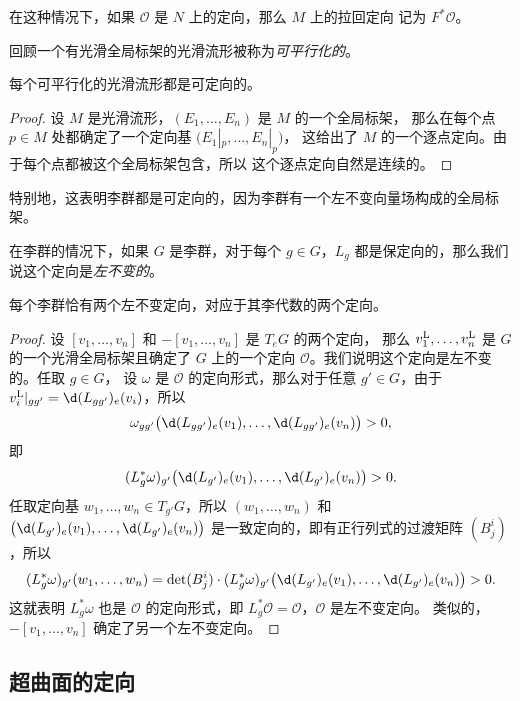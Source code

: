在这种情况下，如果 $\mathcal{O}$ 是 $N$ 上的定向，那么 $M$ 上的拉回定向
记为 $F^*\mathcal{O}$。

回顾一个有光滑全局标架的光滑流形被称为\emph{可平行化的}。

\begin{proposition}
  每个可平行化的光滑流形都是可定向的。
\end{proposition}
\begin{proof}
  设 $M$ 是光滑流形，$(E_1,\dots,E_n)$ 是 $M$ 的一个全局标架，
  那么在每个点 $p\in M$ 处都确定了一个定向基 $\bigl(E_1|_p,\dots,E_n|_p\bigr)$，
  这给出了 $M$ 的一个逐点定向。由于每个点都被这个全局标架包含，所以
  这个逐点定向自然是连续的。
\end{proof}

特别地，这表明李群都是可定向的，因为李群有一个左不变向量场构成的全局标架。

在李群的情况下，如果 $G$ 是李群，对于每个 $g\in G$，$L_g$
都是保定向的，那么我们说这个定向是\emph{左不变的}。

\begin{proposition}
  每个李群恰有两个左不变定向，对应于其李代数的两个定向。
\end{proposition}
\begin{proof}
  设 $[v_1,\dots,v_n]$ 和 $-[v_1,\dots,v_n]$ 是 $T_eG$ 的两个定向，
  那么 $v_1^{\mathrm{L}},\dots,v_n^{\mathrm{L}}$ 是 $G$ 的一个光滑全局标架且确定了
  $G$ 上的一个定向 $\mathcal{O}$。我们说明这个定向是左不变的。任取 $g\in G$，
  设 $\omega$ 是 $\mathcal{O}$ 的定向形式，那么对于任意
  $g'\in G$，由于 $v_i^\LL|_{gg'}=\d (L_{gg'})_e(v_i)$，所以
  \[
    \omega_{gg'}\bigl(\d (L_{gg'})_e(v_1),\dots,\d (L_{gg'})_e(v_n)\bigr)>0,
  \]
  即
  \[
    (L_g^*\omega)_{g'}\bigl(\d (L_{g'})_e(v_1),\dots,\d (L_{g'})_e(v_n)\bigr)>0.
  \]
  任取定向基 $w_1,\dots,w_n\in T_{g'}G$，所以 $(w_1,\dots,w_n)$ 和 $\bigl(\d (L_{g'})_e(v_1),\dots,\d (L_{g'})_e(v_n)\bigr)$
  是一致定向的，即有正行列式的过渡矩阵 $(B^i_j)$，所以
  \[
    (L_g^*\omega)_{g'}(w_1,\dots,w_n)=\det(B^i_j)\cdot (L_g^*\omega)_{g'}\bigl(\d (L_{g'})_e(v_1),\dots,\d (L_{g'})_e(v_n)\bigr)>0.
  \]
  这就表明 $L_g^*\omega$ 也是 $\mathcal{O}$ 的定向形式，即
  $L_g^* \mathcal{O}=\mathcal{O}$，$\mathcal{O}$ 是左不变定向。
  类似的，$-[v_1,\dots,v_n]$ 确定了另一个左不变定向。
\end{proof}

\subsection{超曲面的定向}

